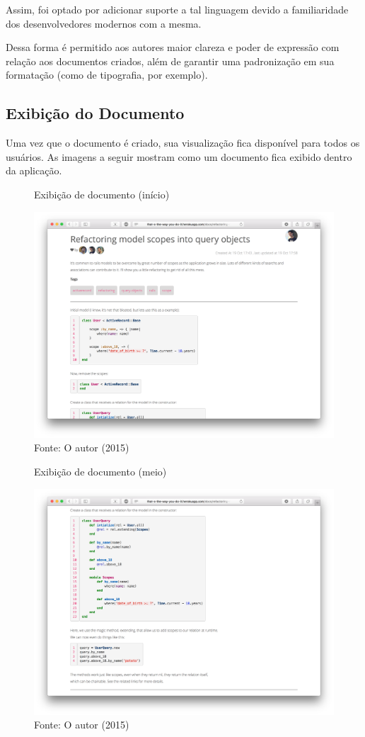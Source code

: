 Assim, foi optado por adicionar suporte a tal linguagem devido a familiaridade dos desenvolvedores modernos com a mesma.

Dessa forma é permitido aos autores maior clareza e poder de expressão com relação aos documentos criados, além de garantir uma padronização em sua formatação (como de tipografia, por exemplo).

\subsection{Exibição do Documento}

Uma vez que o documento é criado, sua visualização fica disponível para todos os usuários. As imagens a seguir mostram como um documento fica exibido dentro da aplicação.

\begin{figure}[h]
	\centering
    \caption{Exibição de documento (início)}
    \includegraphics[width=15cm]{Imagens/print-show-1.png}
	\caption*{Fonte: O autor (2015)}
\end{figure}

\begin{figure}[h]
	\centering
    \caption{Exibição de documento (meio)}
    \includegraphics[width=15cm]{Imagens/print-show-2.png}
	\caption*{Fonte: O autor (2015)}
\end{figure}

